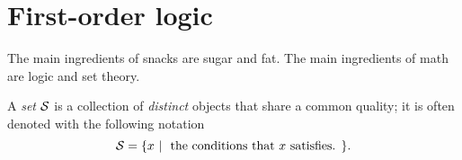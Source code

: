 





\section{First-order logic}
\label{sec:logic}

\begin{rem}
The main ingredients of snacks are sugar and fat.
The main ingredients of math are logic and set theory.
\end{rem}

\begin{defn}
  \label{def:setNotation}
  A \emph{set} ${\cal S}$
  is a collection of \emph{distinct} objects
   that share a common quality; 
   it is often denoted with the following notation
   \begin{equation}
     \label{eq:setNotation}
     {\cal S} = \{ x\ |\ \text{ the conditions that $x$ satisfies. } \}.
   \end{equation}
\end{defn}

